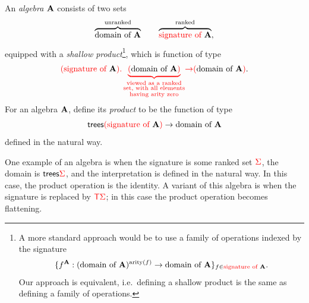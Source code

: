 \begin{definition}
    An \emph{algebra} ${\color{black}\mathbf A}$ consists of two sets 
    \begin{align*}
    \overbrace{{\color{black}\text{domain of }}{\color{black}\mathbf A}}^{\text{unranked}} \qquad \overbrace{{\color{red}{\text{signature of }}}{\color{black}\mathbf A}}^{\text{ranked}},
    \end{align*}
equipped with a  \emph{shallow product}\footnote{
    A more standard approach would be to use a family of operations indexed by the signature
    \begin{align*}
    \{f^{\color{black}\mathbf A} : ({\color{black}\text{domain of }}{\color{black}\mathbf A})^{\mathrm{arity}(f)} \to {\color{black}\text{domain of }}{\color{black}\mathbf A}\}_{f \in {\color{red}{\text{signature of }}}{\color{black}\mathbf A}}.
    \end{align*}
   Our approach is equivalent, i.e.~defining a shallow product is the same as defining a family of operations.
}, which is function of type
\begin{align*}
 {\color{red}{({\color{red}{\text{signature of }}}{\color{black}\mathbf A}) . \underbrace{({\color{black}\text{domain of }}{\color{black}\mathbf A})}_{\substack{\text{viewed as a ranked}\\ \text{set, with all elements}\\ \text{having arity zero}}}}} {\color{red}{\to}} {\color{red}{(}}{\color{black}\text{domain of }}{\color{black}\mathbf A}{\color{red}{)}}.
\end{align*}
    For an algebra ${\color{black}\mathbf A}$, define its \emph{product} to be the function of type
    \begin{align*}
        \mathsf {trees} {\color{red}{(}}{\color{red}{\text{signature of }}}{\color{black}\mathbf A}{\color{red}{)}} \to {\color{black}\text{domain of }}{\color{black}\mathbf A}
    \end{align*}
    defined in the natural way.
\end{definition}


One example of an algebra is when the signature is some ranked set ${\color{red}{\Sigma}}$, the domain is  $\mathsf {trees} {\color{red}{\Sigma}}$, and the interpretation is defined in the natural way. In this case, the product operation is the identity. A variant of this algebra is when the signature is replaced by ${\color{red}{\mathsf T}} {\color{red}{\Sigma}}$; in this case the product operation becomes flattening. 

